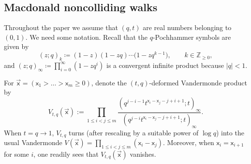 \documentclass[11pt]{article}
\numberwithin{equation}{section}
\numberwithin{equation}{section}
\begin{document}
\subsection{Macdonald noncolliding walks}\label{sub:intro_details}

Throughout the paper we assume that
$(q,t)$ are real numbers belonging to $(0,1)$.
We need some notation.
Recall that the $q$-Pochhammer symbols are given by
\begin{equation*}
	(z;q)_k\coloneqq (1-z)(1-zq)\cdots\big(1-zq^{k-1}\big),
	\qquad
	k\in \mathbb{Z}_{\ge0},
\end{equation*}
and $(z;q)_\infty\coloneqq\prod_{i=0}^{\infty}(1-zq^i)$ is a convergent infinite
product because $|q|<1$.

For $\vec{\mathsf{x}}=(\mathsf{x}_1>\dots>\mathsf{x}_m\ge0 )$,
denote the $(t,q)$-deformed Vandermonde product by
\begin{equation}
	\label{eq:V_tq}
	V_{t,q}(\vec{\mathsf{x}}):=
	\prod_{1\le i<j\le m}
	\frac{\left( q^{j-i-1}t^{\mathsf{x}_i-\mathsf{x}_j-j+i+1};t \right)_{\infty}}
	{(q^{j-i} t^{\mathsf{x}_i-\mathsf{x}_j-j+i+1};t)_{\infty}}.
\end{equation}
When $t=q\to 1$, $V_{t,q}$ turns (after rescaling by a suitable power of $\log q$)
into the
usual Vandermonde
$V(\vec{\mathsf{x}})=\prod_{1\le i<j \le m}(\mathsf{x}_i-
\mathsf{x}_j)$. Moreover,
when $\mathsf{x}_i=\mathsf{x}_{i+1}$ for some $i$,
one readily sees that $V_{t,q}(\vec{\mathsf{x}})$
vanishes.
\end{document}
